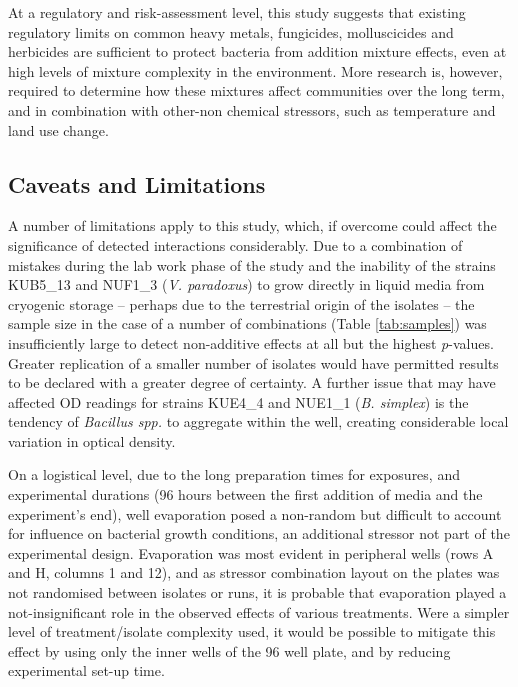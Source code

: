 \documentclass[10pt]{article}
\begin{document}
At a regulatory and risk-assessment level, this study suggests that existing regulatory limits on common heavy metals, fungicides, molluscicides and herbicides are sufficient to protect bacteria from addition mixture effects, even at high levels of mixture complexity in the environment. More research is, however, required to determine how these mixtures affect communities over the long term, and in combination with other-non chemical stressors, such as temperature and land use change.  

\subsection{Caveats and Limitations}
\label{S:4:3}

A number of limitations apply to this study, which, if overcome could affect the significance of detected interactions considerably.  Due to a combination of mistakes during the lab work phase of the study and the inability of the strains KUB5\_13 and NUF1\_3 (\textit{V. paradoxus}) to grow directly in liquid media from cryogenic storage -- perhaps due to the terrestrial origin of the isolates -- the sample size in the case of a number of combinations (Table \ref{tab:samples}) was insufficiently large to detect non-additive effects at all but the highest \textit{p}-values.  Greater replication of a smaller number of isolates would have permitted results to be declared with a greater degree of certainty. A further issue that may have affected OD readings for strains KUE4\_4 and NUE1\_1 (\textit{B. simplex}) is the tendency of \textit{Bacillus spp.} to aggregate within the well, creating considerable local variation in optical density. 

On a logistical level, due to the long preparation times for exposures, and experimental durations (96 hours between the first addition of media and the experiment's end), well evaporation posed a non-random but difficult to account for influence on bacterial growth conditions, an additional stressor not part of the experimental design. Evaporation was most evident in peripheral wells (rows A and H, columns 1 and 12), and as stressor combination layout on the plates was not randomised between isolates or runs, it is probable that evaporation played a not-insignificant role in the observed effects of various treatments. Were a simpler level of treatment/isolate complexity used, it would be possible to mitigate this effect by using only the inner wells of the 96 well plate, and by reducing experimental set-up time. 
\end{document}

